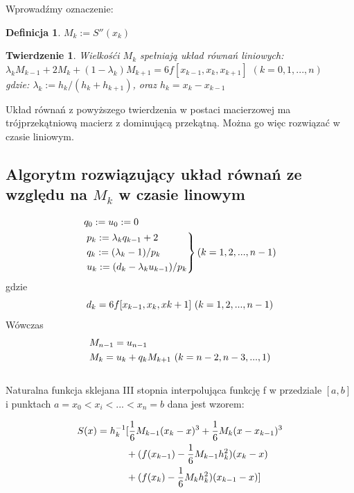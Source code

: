 \documentclass{article}
\newtheorem{defi}{Definicja}
\newtheorem{twr}{Twierdzenie}
\begin{document}
\noindent Wprowadźmy oznaczenie:

\begin{defi}
	$M_k := S''(x_k)$
\end{defi}

\begin{twr}
	Wielkośći $M_k$ spełniają układ równań liniowych:\\
	$\lambda_k M_{k-1} + 2M_k + (1-\lambda_k) M_{k+1} = 6f[x_{k-1},x_k,x_{k+1}]$ \hfill $(k=0,1,...,n)$\\
	gdzie: $\lambda_k := h_k / ( h_k + h_{k+1})$, oraz $h_k = x_k - x_{k-1}$
\end{twr}
	
Układ równań z powyższego twierdzenia w postaci macierzowej ma trójprzekątniową macierz z dominującą przekątną. Można go więc rozwiązać w czasie liniowym.

\subsection{Algorytm rozwiązujący układ równań ze względu na $M_k$ w czasie linowym}

\begin{align}
	&q_0 := u_0 := 0 \\
	\notag
	&\begin{rcases}
		p_k := \lambda_k q_{k-1} + 2 \\ \notag
		q_k := (\lambda_k - 1) / p_k \\ \notag
		u_k := (d_k -\lambda_k u_{k-1}) / p_k
	\end{rcases}
	\text{$(k=1,2,...,n-1)$}
\end{align}
gdzie
\begin{equation*}
	d_k = 6 f[x_{k-1},x_k,x{k+1}] \textnormal{ } (k=1,2,...,n-1)
\end{equation*}
Wówczas
\begin{align*}
	&M_{n-1} = u_{n-1} \\ \notag
	&M_k = u_k + q_k M_{k+1} \textnormal{ } (k =n-2,n-3,...,1 )
\end{align*}
\\

\noindent Naturalna funkcja sklejana III stopnia interpolująca funkcję f w przedziale $[a,b]$ i punktach $a = x_0 < x_i <...<x_n = b$ dana jest wzorem:

\begin{align}
	S(x) = h_{k}^{-1}&[\frac{1}{6} M_{k-1}(x_k - x)^3  
					 +\frac{1}{6} M_k (x - x_{k-1})^3 \\
					 \notag
					 &+(f(x_{k-1}) - \frac{1}{6} M_{k-1} h_{k}^2) (x_k -x ) \\
					 \notag
					 &+(f(x_{k}) - \frac{1}{6} M_{k} h_{k}^2) (x_{k-1} -x )]
\end{align}
\end{document}
